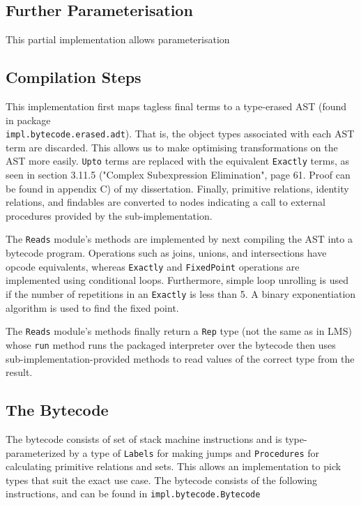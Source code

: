 \documentclass{report}
\newcommand \2[0]{\textbf{2}}
\newcommand \3[0]{\textbf{3}}
\begin{document}
\subsection{Further Parameterisation}
This partial implementation allows parameterisation

\subsection{Compilation Steps}
This implementation first maps tagless final terms to a type-erased AST (found in package \\\texttt{impl.bytecode.erased.adt}). That is, the object types associated with each AST term are discarded. This allows us to make optimising transformations on the AST more easily. \texttt{Upto} terms are replaced with the equivalent \texttt{Exactly} terms, as seen in section 3.11.5 ("Complex Subexpression Elimination", page 61. Proof can be found in appendix C) of my dissertation. Finally, primitive relations, identity relations, and findables are converted to nodes indicating a call to external procedures provided by the sub-implementation.

The \texttt{Reads} module's methods are implemented by next compiling the AST into a bytecode program. Operations such as joins, unions, and intersections have opcode equivalents, whereas \texttt{Exactly} and \texttt{FixedPoint} operations are implemented using conditional loops. Furthermore, simple loop unrolling is used if the number of repetitions in an \texttt{Exactly} is less than 5. A binary exponentiation algorithm is used to find the fixed point.

The \texttt{Reads} module's methods finally return a \texttt{Rep} type (not the same as in LMS) whose \texttt{run} method runs the packaged interpreter over the bytecode then uses sub-implementation-provided methods to read values of the correct type from the result.


\subsection{The Bytecode}
The bytecode consists of set of stack machine instructions and is type-parameterized by a type of \texttt{Labels} for making jumps and \texttt{Procedures} for calculating primitive relations and sets. This allows an implementation to pick types that suit the exact use case. The bytecode consists of the following instructions, and can be found in \texttt{impl.bytecode.Bytecode}
\end{document}
